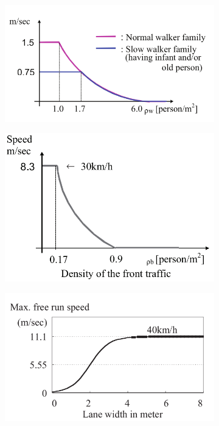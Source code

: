 \begin{figure}[ht]
    \centering
    \begin{subfigure}{0.32\textwidth}
        \includegraphics[width=\textwidth]{images/speed_GOTO.png}
        \caption{}
        \label{fig:goto-ped}
    \end{subfigure}
    \hfill
    \begin{subfigure}{0.32\textwidth}
        \includegraphics[width=\textwidth]{images/speed_GOTO_motocicli.png}
        \caption{}
        \label{fig:goto-moto}
    \end{subfigure}
    \hfill
    \begin{subfigure}{0.32\textwidth}
        \includegraphics[width=\textwidth]{images/speed_GOTO_auto.png}

\end{subfigure}
\end{figure}
